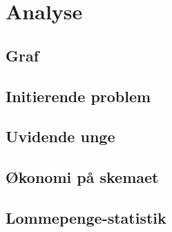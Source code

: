 





\tableofcontents

\chapter{Analyse}

\section{Graf}


\section{Initierende problem}


\section{Uvidende unge}
\label{UvidendeUnge}


\section{Økonomi på skemaet}
\label{Okonomi}


\section{Lommepenge-statistik}
\label{LommeStat}



\tableofcontents











